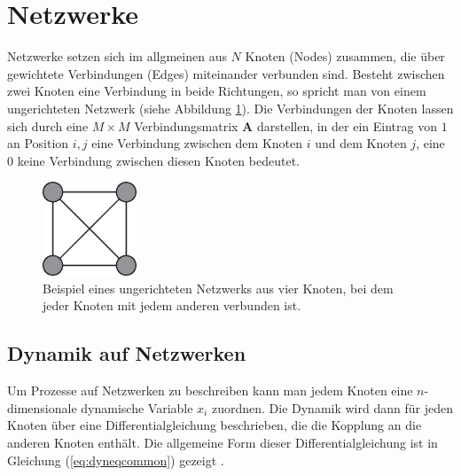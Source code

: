 
\section{Netzwerke}
Netzwerke setzen sich im allgmeinen aus $N$ Knoten (Nodes) zusammen, die über gewichtete Verbindungen (Edges) miteinander verbunden sind. Besteht zwischen zwei Knoten eine Verbindung in beide Richtungen, so spricht man von einem ungerichteten Netzwerk (siehe Abbildung \ref{fig:GraphBsp}). Die Verbindungen der Knoten lassen sich durch eine $M\times M$ Verbindungsmatrix $\boldsymbol{A}$ darstellen, in der ein Eintrag von $1$ an Position $i,j$ eine Verbindung zwischen dem Knoten $i$ und dem Knoten $j$, eine $0$ keine Verbindung zwischen diesen Knoten bedeutet.

\begin{figure}[t]
	 \centering
	\includegraphics[width=0.25\textwidth]{abb/misc/GraphBsp.eps}
	\caption[Ungerichteres Netzwerk]{Beispiel eines ungerichteten Netzwerks aus vier Knoten, bei dem jeder Knoten mit jedem anderen verbunden ist.}
	\label{fig:GraphBsp}
\end{figure}


\subsection*{Dynamik auf Netzwerken}
Um Prozesse auf Netzwerken zu beschreiben kann man jedem Knoten eine $n$-dimensionale dynamische Variable $x_i$ zuordnen. Die Dynamik wird dann für jeden Knoten über eine Differentialgleichung beschrieben, die die Kopplung an die anderen Knoten enthält. Die allgemeine Form dieser Differentialgleichung ist in Gleichung (\ref*{eq:dyneqcommon}) gezeigt \cite{pecora1998}.



